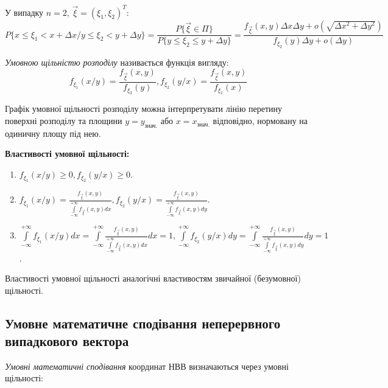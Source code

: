 У випадку $n = 2$, $\vec{\xi} = (\xi_1, \xi_2)^T$: 
\begin{equation*}
    P\{x \leq \xi_1 < x + \Delta x / y \leq \xi_2 < y + \Delta y\} = 
    \frac{P\{\vec{\xi} \in \Pi\}}{P\{y \leq \xi_2 \leq y+\Delta y\}} = 
    \frac{f_{\vec{\xi}}(x,y)\Delta x \Delta y + 
    o(\sqrt{\Delta x^2 + \Delta y^2})}{f_{\xi_2}(y)\Delta y + o(\Delta y)}
\end{equation*}
\begin{definition}
    \emph{Умовною щільністю розподілу} називається функція 
    вигляду:
    \begin{equation*}
        f_{\xi_1}(x/y) = \frac{f_{\vec{\xi}}(x, y)}{f_{\xi_2}(y)}, f_{\xi_2}(y/x) = \frac{f_{\vec{\xi}}(x, y)}{f_{\xi_1}(x)}
    \end{equation*}
\end{definition}

\begin{remark}
    Графік умовної щільності розподілу можна інтерпретувати лінію перетину 
    поверхні розподілу та площини $y = y_{\text{знач.}}$ або
    $x = x_{\text{знач.}}$ відповідно, нормовану на одиничну площу під нею.
\end{remark}

\noindent \textbf{Властивості умовної щільності:}
\begin{enumerate}
    \item $f_{\xi_1}(x / y) \geq 0, f_{\xi_2}(y / x) \geq 0$.
    \item $f_{\xi_1}(x/y) = \frac{f_{\vec{\xi}}(x,y)}
    {\int\limits_{-\infty}^{+\infty}f_{\vec{\xi}}(x,y)dx},
    f_{\xi_2}(y/x) = \frac{f_{\vec{\xi}}(x,y)}
    {\int\limits_{-\infty}^{+\infty}f_{\vec{\xi}}(x,y)dy}$.
    \item $\int\limits_{-\infty}^{+\infty} f_{\xi_1}(x / y) dx = 
    \int\limits_{-\infty}^{+\infty}\frac{f_{\vec{\xi}}(x,y)}
    {\int\limits_{-\infty}^{+\infty}f_{\vec{\xi}}(x,y)dx}dx = 1,
    \int\limits_{-\infty}^{+\infty} f_{\xi_2}(y / x) dy = 
    \int\limits_{-\infty}^{+\infty}\frac{f_{\vec{\xi}}(x,y)}
    {\int\limits_{-\infty}^{+\infty}f_{\vec{\xi}}(x,y)dy}dy = 1$.
\end{enumerate}
Властивості умовної щільності аналогічні властивостям звичайної (безумовної) щільності.

\subsection{Умовне математичне сподівання неперервного випадкового вектора}
\emph{Умовні математичні сподівання} координат НВВ визначаються через умовні щільності:

